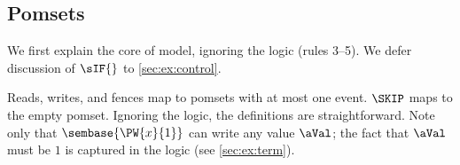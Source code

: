 


\subsection{Pomsets}
\label{sec:ex:pomset}

We first explain the core of model, ignoring the logic (rules 3--5).
We defer discussion of $\sIF{}$ to \textsection\ref{sec:ex:control}.

Reads, writes, and fences map to pomsets with at most one event.  $\SKIP$
maps to the empty pomset.  Ignoring the logic, the definitions are
straightforward.  Note only that $\sembase{\PW{x}{1}}$ can write any value
$\aVal$; the fact that $\aVal$ must be $1$ is captured in the logic (see
\textsection\ref{sec:ex:term}).

